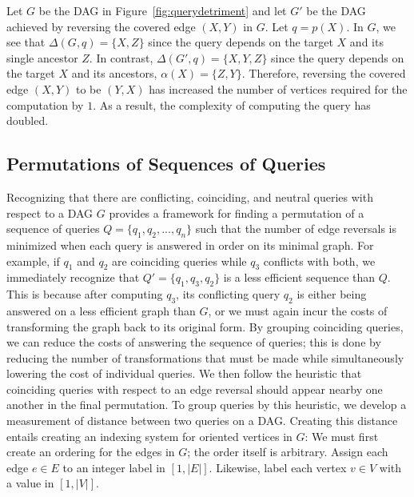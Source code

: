 \begin{example} Let $G$ be the DAG in Figure~\ref{fig:querydetriment} and let $G'$ be the DAG achieved by reversing the covered edge $(X,Y)$ in $G$. Let $q = p(X)$. In $G$, we see that $\Delta(G,q) = \{X,Z\}$ since the query depends on the target $X$ and its single ancestor $Z$. \newline
\null \quad \quad In contrast, $\Delta(G',q) = \{X,Y,Z\}$ since the query depends on the target $X$ and its ancestors, $\alpha(X) = \{Z,Y\}$. Therefore, reversing the covered edge $(X,Y)$ to be $(Y,X)$ has increased the number of vertices required for the computation by $1$. As a result, the complexity of computing the query has doubled.
\end{example}

\subsection{Permutations of Sequences of Queries}
\null \quad \quad Recognizing that there are conflicting, coinciding, and neutral queries with respect to a DAG $G$ provides a framework for finding a permutation of a sequence of queries $Q = \{q_{1}, q_{2}, ..., q_{n}\}$ such that the number of edge reversals is minimized when each query is answered in order on its minimal graph. \newline
\null \quad \quad For example, if $q_{1}$ and $q_{2}$ are coinciding queries while $q_{3}$ conflicts with both, we immediately recognize that $Q'=\{q_{1},q_{3},q_{2}\}$ is a less efficient sequence than $Q$. This is because after computing $q_{3}$, its conflicting query $q_{2}$ is either being answered on a less efficient graph than $G$, or we must again incur the costs of transforming the graph back to its original form. By grouping coinciding queries, we can reduce the costs of answering the sequence of queries; this is done by reducing the number of transformations that must be made while simultaneously lowering the cost of individual queries. We then follow the heuristic that coinciding queries with respect to an edge reversal should appear nearby one another in the final permutation. \newline
\null \quad \quad To group queries by this heuristic, we develop a measurement of distance between two queries on a DAG. Creating this distance entails creating an indexing system for oriented vertices in $G$: \newline
\null \quad \quad We must first create an ordering for the edges in $G$; the order itself is arbitrary. Assign each edge $e \in E$ to an integer label in $[1,|E|]$. Likewise, label each vertex $v \in V$ with a value in $[1,|V|]$. 

